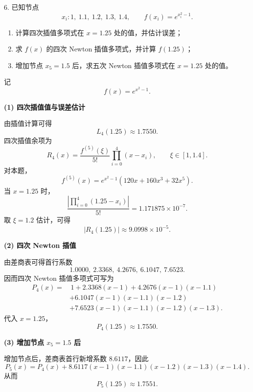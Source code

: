 \documentclass[11pt, a4paper]{ctexart}
\begin{document}
\begin{problem}{6. 已知节点}
    \[
        x_i: 1,\ 1.1,\ 1.2,\ 1.3,\ 1.4,\qquad f(x_i)=e^{x_i^2-1}.
    \]
    \begin{enumerate}[(1)]
        \item 计算四次插值多项式在 $x=1.25$ 处的值，并估计误差；
        \item 求 $f(x)$ 的四次 Newton 插值多项式，并计算 $f(1.25)$；
        \item 增加节点 $x_5=1.5$ 后，求五次 Newton 插值多项式在 $x=1.25$ 处的值。
    \end{enumerate}
\end{problem}

\begin{solution}
    记
    \[
        f(x)=e^{x^2-1}.
    \]

    \textbf{(1) 四次插值值与误差估计}

    由插值计算可得
    \[
        L_4(1.25)\approx 1.7550.
    \]
    四次插值余项为
    \[
        R_4(x)=\frac{f^{(5)}(\xi)}{5!}\prod_{i=0}^{4}(x-x_i),\qquad \xi\in[1,1.4].
    \]
    对本题，
    \[
        f^{(5)}(x)=e^{x^2-1}(120x+160x^3+32x^5).
    \]
    当 $x=1.25$ 时，
    \[
        \frac{\left|\prod_{i=0}^{4}(1.25-x_i)\right|}{5!}
        =1.171875\times 10^{-7}.
    \]
    取 $\xi=1.2$ 估计，可得
    \[
        |R_4(1.25)|\approx 9.0998\times 10^{-5}.
    \]

    \textbf{(2) 四次 Newton 插值}

    由差商表可得首行系数
    \[
        1.0000,\ 2.3368,\ 4.2676,\ 6.1047,\ 7.6523.
    \]
    因而四次 Newton 插值多项式可写为
    \[
        \begin{aligned}
            P_4(x)=&\,1
            +2.3368(x-1)
            +4.2676(x-1)(x-1.1) \\
            &+6.1047(x-1)(x-1.1)(x-1.2) \\
            &+7.6523(x-1)(x-1.1)(x-1.2)(x-1.3).
        \end{aligned}
    \]
    代入 $x=1.25$，
    \[
        P_4(1.25)\approx 1.7550.
    \]

    \textbf{(3) 增加节点 $x_5=1.5$ 后}

    增加节点后，差商表首行新增系数 $8.6117$，因此
    \[
        P_5(x)=P_4(x)+8.6117(x-1)(x-1.1)(x-1.2)(x-1.3)(x-1.4).
    \]
    从而
    \[
        P_5(1.25)\approx 1.7551.
    \]
\end{solution}
\end{document}
